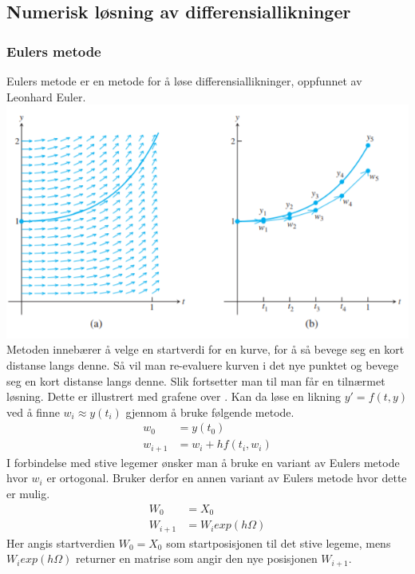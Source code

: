 \graphicspath{ {./bilder/} }
\subsection{Numerisk løsning av differensiallikninger}
\subsubsection{Eulers metode}
Eulers metode er en metode for å løse differensiallikninger, oppfunnet av Leonhard Euler. \newline
\includegraphics{rapport/teori/bilder/eulers.png}\newline\newline
Metoden innebærer å velge en startverdi for en kurve, for å så bevege seg en kort distanse langs denne. Så vil man re-evaluere kurven i det nye punktet og bevege seg en kort distanse langs denne. Slik fortsetter man til man får en tilnærmet løsning. Dette er illustrert med grafene over \cite{MATEMATIKK:1}.\newline\newline
Kan da løse en likning $y' = f(t, y)$ ved å finne $w_i \approx y(t_i)$ gjennom å bruke følgende metode.
\begin{equation}
\begin{aligned}
    w_0&=y(t_0)\\
    w_{i+1}&=w_i + hf(t_i, w_i)
\end{aligned}
\end{equation}
I forbindelse med stive legemer ønsker man å bruke en variant av Eulers metode hvor $w_i$ er ortogonal. Bruker derfor en annen variant av Eulers metode hvor dette er mulig.
\begin{equation}
\begin{aligned}
    W_0&=X_0\\
    W_{i+1}&=W_iexp(h\Omega)
\end{aligned}
\end{equation}
Her angis startverdien $W_0=X_0$ som startposisjonen til det stive legeme, mens $W_iexp(h\Omega)$ returner en matrise som angir den nye posisjonen $W_{i+1}$.


